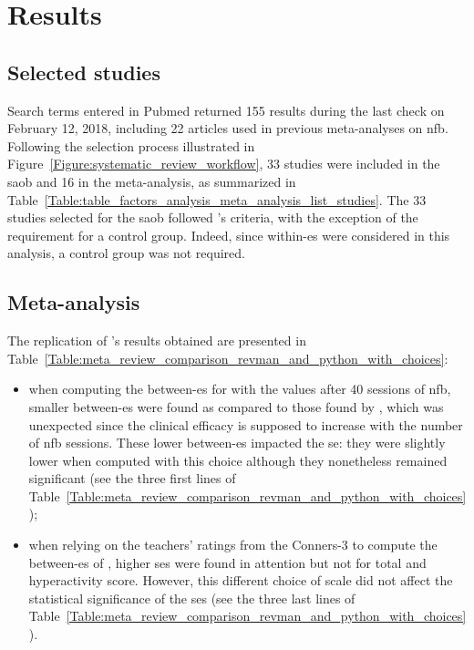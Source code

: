 

\section{Results}

\subsection{Selected studies}

Search terms entered in Pubmed returned 155 results during the last check on February 12, 2018, including 22 
articles used in previous meta-analyses on \gls{nfb}. Following the selection process illustrated 
in Figure~\ref{Figure:systematic_review_workflow}, 33 studies were included in the \gls{saob} and 16 in the meta-analysis, 
as summarized in Table~\ref{Table:table_factors_analysis_meta_analysis_list_studies}. The 33 studies selected for the \gls{saob} 
followed \citeauthor{Cortese2016}'s criteria, with the exception of the requirement for a control group. 
Indeed, since within-\gls{es} were considered in this analysis, a control group was not required.

\subsection{Meta-analysis}

The replication of \citeauthor{Cortese2016}'s results obtained are presented 
in Table~\ref{Table:meta_review_comparison_revman_and_python_with_choices}:

\begin{itemize}
    \item when computing the between-\gls{es} for \citet{Arnold2014} with the values after 40 sessions of \gls{nfb}, 
      smaller between-\gls{es} were found as compared to those found by \citet{Cortese2016}, which was unexpected since  
			the clinical efficacy is supposed to increase with the number of \gls{nfb} sessions. These lower between-\gls{es}
			impacted the \gls{se}: they were slightly lower when computed with this choice although they nonetheless remained significant (see the three first lines 
			of Table~\ref{Table:meta_review_comparison_revman_and_python_with_choices});  
    \item when relying on the teachers' ratings from the Conners-3 to compute the between-\gls{es} of \citet{Steiner2014}, 
		higher \glspl{se} were found in attention but not for total and hyperactivity score. However, this different choice of 
		scale did not affect the statistical significance of the \glspl{se} (see the three last lines 
			of Table~\ref{Table:meta_review_comparison_revman_and_python_with_choices}).
\end{itemize}

